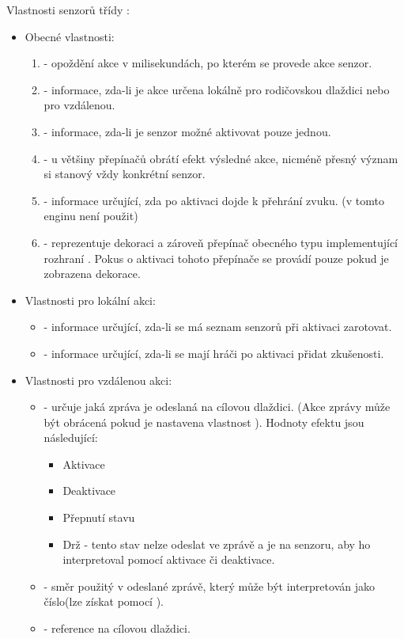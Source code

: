 Vlastnosti senzorů třídy :
\begin{itemize}
\item Obecné vlastnosti:
	\begin{enumerate}
	\item {} - opoždění akce v milisekundách, po kterém se provede akce senzor.
	\item {} - informace, zda-li je akce určena lokálně pro rodičovskou dlaždici nebo pro vzdálenou.
	\item {} - informace, zda-li je senzor možné aktivovat pouze jednou.
	\item {} - u většiny přepínačů obrátí efekt výsledné akce, nicméně přesný význam si stanový vždy konkrétní senzor. 
	\item {} - informace určující, zda po aktivaci dojde k přehrání zvuku. (v tomto enginu není použit)
	\item {} - reprezentuje dekoraci a zároveň přepínač obecného typu implementující rozhraní .
			Pokus o aktivaci tohoto přepínače se provádí pouze pokud je zobrazena dekorace.
	\end{enumerate}

\item Vlastnosti pro lokální akci:
	\begin{itemize}
	\item {} - informace určující, zda-li se má seznam senzorů při aktivaci zarotovat.
	\item {} - informace určující, zda-li se mají hráči po aktivaci přidat zkušenosti.
	\end{itemize}

\item Vlastnosti pro vzdálenou akci:
	\begin{itemize}
	\item {} - určuje jaká zpráva je odeslaná na cílovou dlaždici. (Akce zprávy může být obrácená pokud je nastavena vlastnost ).
	Hodnoty efektu jsou následující:
		\begin{itemize}
		\item Aktivace 
		\item Deaktivace
		\item Přepnutí stavu
		\item Drž - tento stav nelze odeslat ve zprávě a je na senzoru, aby ho interpretoval pomocí aktivace či deaktivace.
		\end{itemize}
	\item {} - směr použitý v odeslané zprávě, který může být interpretován jako číslo(lze získat pomocí ).
	\item {} - reference na cílovou dlaždici.
	\end{itemize}
\end{itemize}

